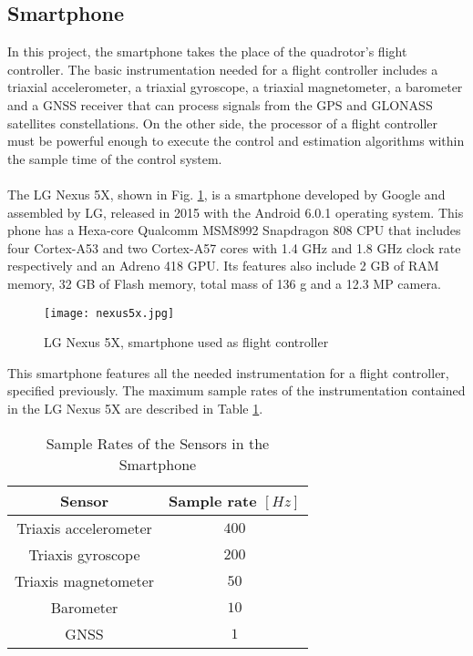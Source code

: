 \subsection{Smartphone}
In this project, the smartphone takes the place of the quadrotor's flight controller. The basic instrumentation needed for a flight controller includes a triaxial accelerometer, a triaxial gyroscope, a triaxial magnetometer, a barometer and a GNSS receiver that can process signals from the GPS and GLONASS satellites constellations. On the other side, the processor of a flight controller must be powerful enough to execute the control and estimation algorithms within the sample time of the control system.
\\\\
The LG Nexus 5X, shown in Fig. \ref{fig:nexus}, is a smartphone developed by Google and assembled by LG, released in 2015 with the Android 6.0.1 operating system. This phone has a Hexa-core Qualcomm MSM8992 Snapdragon 808 CPU that includes four Cortex-A53 and two Cortex-A57 cores with 1.4 GHz and 1.8 GHz clock rate respectively and an Adreno 418 GPU. Its features also include 2 GB of RAM memory, 32 GB of Flash memory, total mass of 136 g and a 12.3 MP camera.
\\
\begin{figure}[H]
\begin{center}
\texttt{[image: nexus5x.jpg]}    
\caption[LG Nexus 5X, smartphone used as flight controller]{LG Nexus 5X, smartphone used as flight controller\protect\footnotemark} 
\label{fig:nexus}
\end{center}
 \end{figure}
 \vspace{-0.5cm}
This smartphone features all the needed instrumentation for a flight controller, specified previously. The maximum sample rates of the instrumentation contained in the LG Nexus 5X are described in Table \ref{tb:samplerates}.
\begin{table}[h]
\small
\begin{center}
\caption{Sample Rates of the Sensors in the Smartphone}\label{tb:samplerates}
\begin{tabular}{c|c}\hline
\rule{0pt}{3ex} Sensor & Sample rate $[Hz]$ \\\hline\hline
\rule{0pt}{3ex}Triaxis accelerometer &  $400$ \\[0.7ex]
Triaxis gyroscope &  $200$ \\[0.7ex]
Triaxis magnetometer & $50$ \\[0.7ex]
Barometer &  $10$ \\[0.7ex] 
GNSS &  $1$  \\[0.7ex]\hline
\end{tabular}
\end{center}
\end{table}
